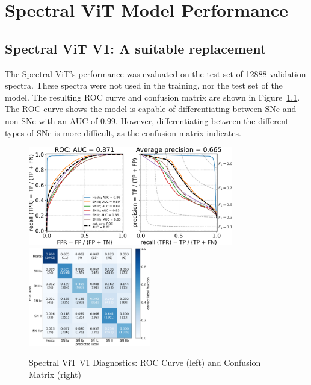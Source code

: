 \chapter{Spectral ViT Model Performance}
\label{chap:results}

\section{Spectral ViT V1: A suitable replacement}\label{sec:v1_results}
The Spectral ViT's performance was evaluated on the test set of 12888 validation spectra.
These spectra were not used in the training, nor the test set of the model. The resulting 
ROC curve and confusion matrix are shown in Figure~\ref{fig:v1_qual}. The ROC curve 
shows the model is capable of differentiating between SNe and non-SNe with an AUC of 0.99.
However, differentiating between the different types of SNe is more difficult, as the
confusion matrix indicates. 
\begin{figure}
    \centering
    \includegraphics[height=4.3cm]{figures/v1_real/vit_model_V1_original_redorocfulle_e31.png}
    \quad
    \includegraphics[height=4.3cm]{figures/v1_real/vit_model_V1_original_redocmfull_e31.png}
    \caption[Spectral ViT V1 Diagnostics]{Spectral ViT V1 Diagnostics: ROC Curve (left) and Confusion Matrix (right)\label{fig:v1_qual}}
\end{figure}

